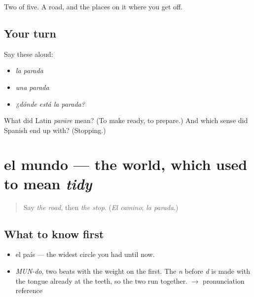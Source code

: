 \begin{grammarlens}[title={What you've built}]
Two of five. A road, and the places on it where you get off.
\end{grammarlens}

\subsection*{Your turn}
Say these aloud:

\begin{itemize}
\raggedright
  \item \emph{la parada}
  \item \emph{una parada}
  \item \emph{¿dónde está la parada?}
\end{itemize}

\begin{tcolorbox}[breakable,colback=teal!4,colframe=teal!35!black,title={Before you move on}]
What did Latin \emph{parāre} mean? (To make ready, to prepare.) And which sense did Spanish end up with? (Stopping.)
\end{tcolorbox}
\section[el mundo]{el mundo — the world, which used to mean \emph{tidy}}

\label{lesson:ES-C330-mundo}



\begin{quote}
Say \emph{the road}, then \emph{the stop}. (\emph{El camino}; \emph{la parada}.)
\end{quote}

\subsection*{What to know first}
\begin{itemize}
\raggedright
  \item el país — the widest circle you had until now.
\end{itemize}

\begin{sounds}
\begin{itemize}
\raggedright
  \item \emph{MUN-do}, two beats with the weight on the first. The \emph{n} before \emph{d} is made with the tongue already at the teeth, so the two run together. $\to$ pronunciation reference
\end{itemize}
\end{sounds}

